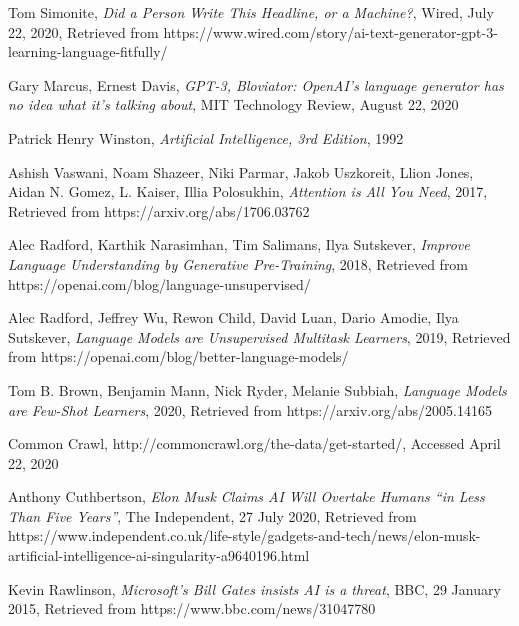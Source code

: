 \documentclass[12pt]{article}
\begin{document}
\newpage
\begin{thebibliography}{9}
	Tom Simonite,
	\textit{Did a Person Write This Headline, or a Machine?},
	Wired,
	July 22, 2020,
	Retrieved from 
	https://www.wired.com/story/ai-text-generator-gpt-3-learning-language-fitfully/

	Gary Marcus, Ernest Davis,
	\textit{GPT-3, Bloviator: OpenAI’s language generator has no idea what it’s
	talking about},
	MIT Technology Review,
	August 22, 2020

	Patrick Henry Winston,
	\textit{Artificial Intelligence, 3rd Edition},
	1992

	Ashish Vaswani, Noam Shazeer, Niki Parmar, Jakob Uszkoreit,
	Llion Jones, Aidan N. Gomez, L. Kaiser, Illia Polosukhin,
	\textit{Attention is All You Need},
	2017,
	Retrieved from https://arxiv.org/abs/1706.03762

	Alec Radford, Karthik Narasimhan, Tim Salimans, Ilya Sutskever,
	\textit{Improve Language Understanding by Generative Pre-Training},
	2018,
	Retrieved from https://openai.com/blog/language-unsupervised/

	Alec Radford, Jeffrey Wu, Rewon Child, David Luan,
	Dario Amodie, Ilya Sutskever,
	\textit{Language Models are Unsupervised Multitask Learners},
	2019,
	Retrieved from https://openai.com/blog/better-language-models/

	Tom B. Brown, Benjamin Mann, Nick Ryder, Melanie Subbiah,
	\textit{Language Models are Few-Shot Learners},
	2020,
	Retrieved from https://arxiv.org/abs/2005.14165
	
	Common Crawl,
	http://commoncrawl.org/the-data/get-started/,
	Accessed April 22, 2020

	Anthony Cuthbertson,
	\textit{Elon Musk Claims AI Will Overtake Humans ``in Less Than Five Years''},
	The Independent,
	27 July 2020,
	Retrieved from https://www.independent.co.uk/life-style/gadgets-and-tech/news/elon-musk-artificial-intelligence-ai-singularity-a9640196.html

	Kevin Rawlinson,
	\textit{Microsoft's Bill Gates insists AI is a threat},
	BBC,
	29 January 2015,
	Retrieved from https://www.bbc.com/news/31047780


\end{thebibliography}
\end{document}

